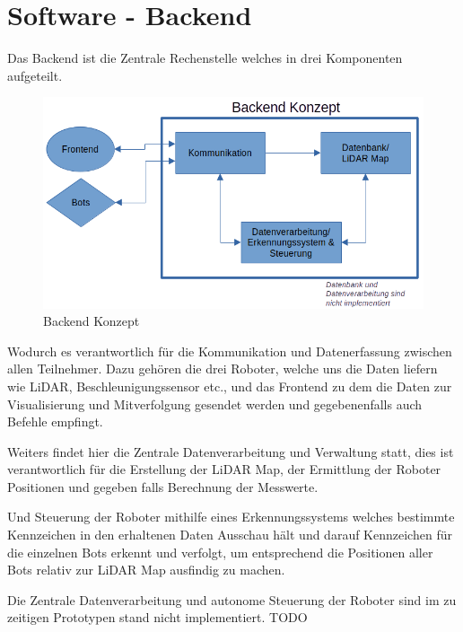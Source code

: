 

\chapter{Software - Backend}
\label{sec:software_backend}
Das Backend ist die Zentrale Rechenstelle welches in drei Komponenten aufgeteilt.

\begin{figure}[H]
    \includegraphics[width=\textwidth, center]{img/backend-konzept.png}
    \caption{Backend Konzept}
    \label{fig:backend_konzept}
\end{figure}

Wodurch es verantwortlich für die Kommunikation und Datenerfassung zwischen allen Teilnehmer. 
Dazu gehören die drei Roboter, welche uns die Daten liefern wie LiDAR, Beschleunigungssensor etc., 
und das Frontend zu dem die Daten zur Visualisierung und Mitverfolgung gesendet werden 
und gegebenenfalls auch Befehle empfingt.

Weiters findet hier die Zentrale Datenverarbeitung und Verwaltung statt, 
dies ist verantwortlich für die Erstellung der LiDAR Map, 
der Ermittlung der Roboter Positionen 
und gegeben falls Berechnung der Messwerte. 

Und Steuerung der Roboter mithilfe eines Erkennungssystems 
welches bestimmte Kennzeichen in den erhaltenen Daten Ausschau hält und 
darauf Kennzeichen für die einzelnen Bots erkennt und verfolgt, 
um entsprechend die Positionen aller Bots relativ zur LiDAR Map ausfindig zu machen.

Die Zentrale Datenverarbeitung und autonome Steuerung der Roboter sind 
im zu zeitigen Prototypen stand nicht implementiert.
TODO 

